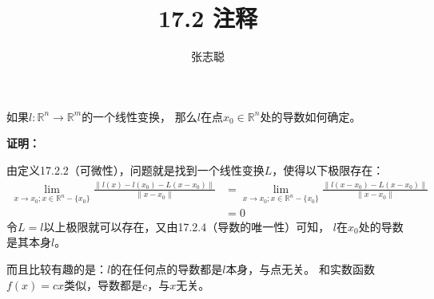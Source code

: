 \documentclass{article}
\begin{document}
\title{17.2 注释}
\author{张志聪}
\maketitle

\begin{zremark}
  如果$l: \mathbb{R}^n \to \mathbb{R}^m$的一个线性变换，
  那么$l$在点$x_0 \in \mathbb{R}^n$处的导数如何确定。
\end{zremark}

\textbf{证明：}

由定义17.2.2（可微性），问题就是找到一个线性变换$L$，使得以下极限存在：
\begin{align*}
  \lim\limits_{x \to x_0; x \in \mathbb{R}^n - \{x_0\}} \frac{\|l(x) - l(x_0) - L(x - x_0)\|}{\|x - x_0\|}
   & = \lim\limits_{x \to x_0; x \in \mathbb{R}^n - \{x_0\}} \frac{\|l(x - x_0) - L(x - x_0)\|}{\|x - x_0\|} \\
   & = 0
\end{align*}
令$L = l$以上极限就可以存在，又由17.2.4（导数的唯一性）可知，
$l$在$x_0$处的导数是其本身$l$。

而且比较有趣的是：$l$的在任何点的导数都是$l$本身，与点无关。
和实数函数$f(x) = c x$类似，导数都是$c$，与$x$无关。
\end{document}
